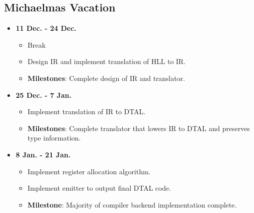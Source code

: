 \documentclass[a4paper, 12pt]{article}
\begin{document}
\subsection{Michaelmas Vacation}
\begin{itemize}
  \item \textbf{11 Dec. - 24 Dec.}
    \begin{itemize}
      \item Break
      \item Design IR and implement translation of HLL to IR.
      \item \textbf{Milestones}: Complete design of IR and translator.
    \end{itemize}
  \item \textbf{25 Dec. - 7 Jan.}
    \begin{itemize}
      \item Implement translation of IR to DTAL.
      \item \textbf{Milestones}: Complete translator that lowers IR to DTAL and preserves type information.
    \end{itemize}
  \item \textbf{8 Jan. - 21 Jan.}
    \begin{itemize}
      \item Implement register allocation algorithm.
      \item Implement emitter to output final DTAL code.
      \item \textbf{Milestone}: Majority of compiler backend implementation complete.
    \end{itemize}
\end{itemize}
\end{document}

